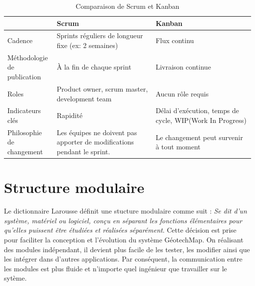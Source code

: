         \par    
\begin{table}
        \centering
        \begin{tabular}{|p{0.20\linewidth}|p{0.40\linewidth}|p{0.40\linewidth}|}
        \hline
                \textbf{} & \textbf{Scrum}& \textbf{Kanban}  \\
                \hline
                Cadence &
                Sprints réguliers de longueur fixe (ex: 2 semaines)&
                Flux continu
                \\
                \hline
                Méthodologie de publication&
                À la fin de chaque sprint&
                Livraison continue
                    \\
                \hline
                Roles &
                Product owner, scrum master, development team&
                Aucun rôle requis
                    \\
                \hline
                Indicateurs clés&
                Rapidité&
                Délai d'exécution, temps de cycle, WIP(Work In Progress)
                    \\
                \hline
                Philosophie de changement&
                Les équipes ne doivent pas apporter de modifications pendant le sprint.&
                Le changement peut survenir à tout moment
                        \\

                \hline 
        \end{tabular}
        \caption{Comparaison de Scrum et Kanban} \label{tab:scrumvskanban}
\end{table}
\par
        
        
        

        \section{Structure modulaire}
                Le dictionnaire Larousse définit une stucture modulaire comme suit : 
                \textit{Se dit d'un système, matériel ou logiciel, conçu en séparant les 
                fonctions élémentaires pour qu'elles puissent être étudiées et réalisées séparément}\cite{Larousse}. 
                Cette décision est prise pour faciliter la conception et l'évolution du système GéotechMap.
                On réalisant des modules indépendant, il devient plus facile de les tester, les modifier 
                ainsi que les intégrer dans d'autres applications. Par conséquent, la communication entre les modules 
                est plus fluide et n'importe quel ingénieur que travailler sur le sytème.
